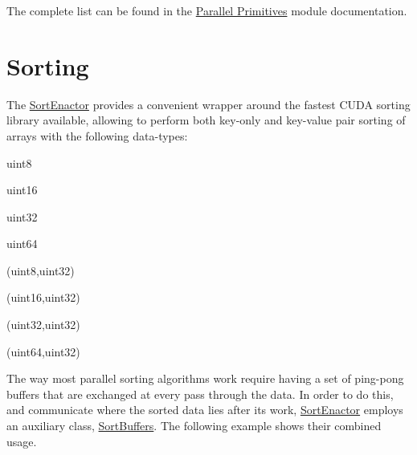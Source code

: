 \begin{DoxyParagraph}{}
The complete list can be found in the \hyperlink{group___primitives}{Parallel Primitives} module documentation. 
\end{DoxyParagraph}
\hypertarget{sorting_page}{}\section{Sorting}\label{sorting_page}
\begin{DoxyParagraph}{}
The \hyperlink{structcugar_1_1cuda_1_1_sort_enactor}{Sort\+Enactor} provides a convenient wrapper around the fastest C\+U\+DA sorting library available, allowing to perform both key-\/only and key-\/value pair sorting of arrays with the following data-\/types\+: 
\end{DoxyParagraph}
\begin{DoxyParagraph}{}

\begin{DoxyItemize}
\item uint8
\item uint16
\item uint32
\item uint64
\item (uint8,uint32)
\item (uint16,uint32)
\item (uint32,uint32)
\item (uint64,uint32) 
\end{DoxyItemize}
\end{DoxyParagraph}
\begin{DoxyParagraph}{}
The way most parallel sorting algorithms work require having a set of ping-\/pong buffers that are exchanged at every pass through the data. In order to do this, and communicate where the sorted data lies after its work, \hyperlink{structcugar_1_1cuda_1_1_sort_enactor}{Sort\+Enactor} employs an auxiliary class, \hyperlink{structcugar_1_1cuda_1_1_sort_buffers}{Sort\+Buffers}. The following example shows their combined usage.
\end{DoxyParagraph}

